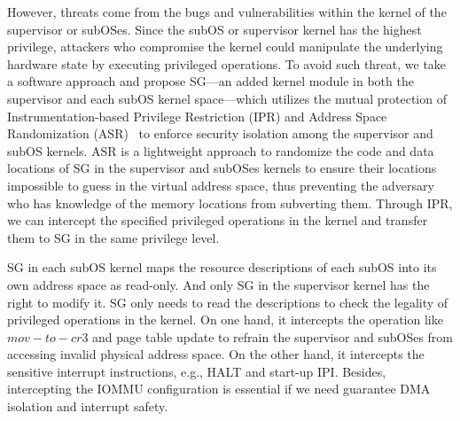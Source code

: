 \documentclass[pageno]{jpaper}
\begin{document}
However,  threats come from the bugs and vulnerabilities within the kernel of the supervisor or subOSes. Since the subOS or supervisor kernel has the highest privilege, attackers who compromise the kernel could manipulate the underlying hardware state  by executing privileged operations.
To avoid such threat, we take a software approach
and propose SG---an added kernel module in both the supervisor and each subOS kernel space---which  utilizes the mutual protection of Instrumentation-based Privilege Restriction (IPR) and Address Space Randomization (ASR)~\cite{Deng:2017:DWT} to enforce security isolation among the supervisor and subOS kernels.
ASR is a lightweight approach to randomize the code and data locations of SG in the supervisor and subOSes kernels  to ensure their locations impossible to guess in the virtual address space, thus preventing the adversary who has knowledge of the memory locations from subverting them.
Through IPR, we can intercept the specified privileged operations in the kernel and transfer them to SG in the same privilege level.








SG in each subOS kernel maps the resource descriptions of each subOS into its own address space as read-only. And only SG in the supervisor kernel has the right to modify it. SG only needs to read the descriptions to check the legality of privileged operations in the kernel. On one hand, it intercepts the operation like $mov-to-cr3$ and page table update to refrain the supervisor and subOSes from accessing invalid physical address space.
On the other hand, it intercepts the sensitive interrupt instructions, e.g., HALT and start-up IPI. Besides, intercepting the IOMMU configuration is essential if we need guarantee DMA isolation and interrupt safety.
\end{document}
